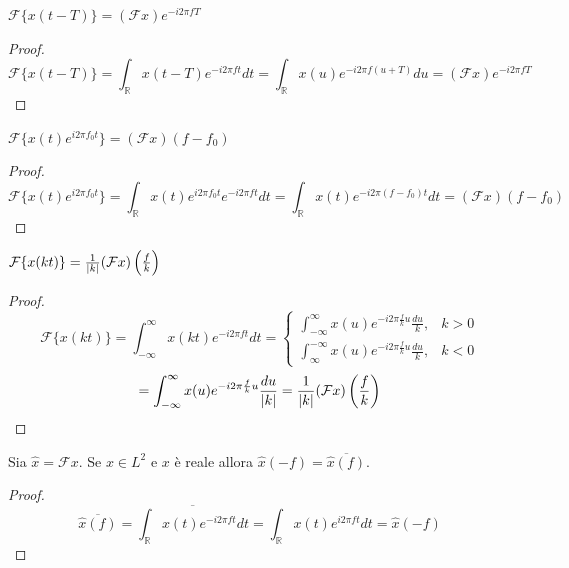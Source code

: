         \begin{property}[Traslazione]\label{prop:shift}
            $\mathcal{F}\{x(t - T)\} = (\mathcal{F}x)e^{-i 2 \pi f T}$
        \end{property}
        \begin{proof}
            \[
                \mathcal{F}\{x(t - T)\} = \int_{\mathbb{R}} x(t - T) e^{-i 2 \pi f t} dt = \int_{\mathbb{R}} x(u) e^{-i 2 \pi f (u + T)} du = (\mathcal{F}x)e^{-i 2 \pi f T} 
            \]   
        \end{proof}

        \begin{property}[Modulazione]
            $\mathcal{F}\{x(t) e^{i 2 \pi f_0 t}\} = (\mathcal{F}x)(f - f_0)$
        \end{property}
        \begin{proof}
            \[
                \mathcal{F}\{x(t) e^{i 2 \pi f_0 t}\} = \int_{\mathbb{R}} x(t) e^{i 2 \pi f_0 t} e^{-i 2 \pi f t} dt = \int_{\mathbb{R}} x(t) e^{-i 2 \pi (f - f_0) t} dt = (\mathcal{F}x)(f - f_0)
            \] 
        \end{proof}

        \begin{property}[Scalamento]
            $\mathcal{F}\{x(kt)\} = \frac{1}{|k|} (\mathcal{F}x)\qty(\frac{f}{k})$
        \end{property}
        \begin{proof}
            \[
                \mathcal{F}\{x(kt)\} = \int_{-\infty}^{\infty} x(kt) e^{-i 2 \pi f t} dt = 
                \begin{cases}
                    \int_{-\infty}^{\infty} x(u) e^{-i 2 \pi \frac{f}{k} u} \frac{du}{k}, &k > 0\\
                    \int_{\infty}^{-\infty} x(u) e^{-i 2 \pi \frac{f}{k} u} \frac{du}{k}, &k < 0
                \end{cases}
            \]
            \[
                = \int_{-\infty}^{\infty} x(u) e^{-i 2 \pi \frac{f}{k} u} \frac{du}{|k|}
                = \frac{1}{|k|} (\mathcal{F}x)\qty(\frac{f}{k})
            \]
        \end{proof}

        \begin{property}
            Sia $\hat{x} = \mathcal{F} x$.
            Se $x \in L^2$ e $x$ è reale allora $\hat{x}(-f) = \overline{\hat{x}(f)}$.
        \end{property}
        \begin{proof}
            \[
                \overline{\hat{x}(f)} = \overline{\int_{\mathbb{R}} x(t) e^{-i 2 \pi f t} dt} = \int_{\mathbb{R}} x(t) e^{i 2 \pi f t} dt = \hat{x}(-f)
            \] 
        \end{proof}

